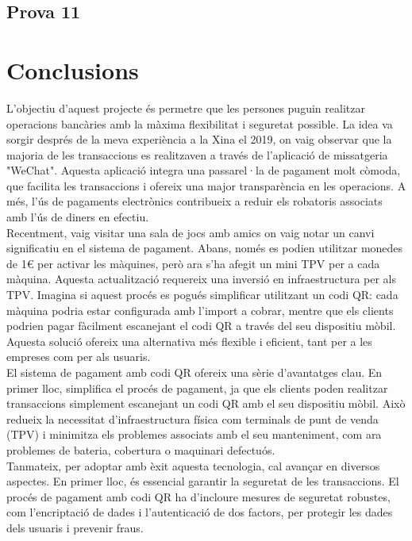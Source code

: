 \documentclass[a4paper,12pt,twoside]{ThesisStyle}
\begin{document}
\section{Prova 11}





\chapter{Conclusions}
\label{chp:conclusions}


L'objectiu d'aquest projecte és permetre que les persones puguin realitzar operacions bancàries amb la màxima flexibilitat i seguretat possible. La idea va sorgir després de la meva experiència a la Xina el 2019, on vaig observar que la majoria de les transaccions es realitzaven a través de l'aplicació de missatgeria "WeChat". Aquesta aplicació integra una passarel·la de pagament molt còmoda, que facilita les transaccions i ofereix una major transparència en les operacions. A més, l'ús de pagaments electrònics contribueix a reduir els robatoris associats amb l'ús de diners en efectiu.\\

Recentment, vaig visitar una sala de jocs amb amics on vaig notar un canvi significatiu en el sistema de pagament. Abans, només es podien utilitzar monedes de 1€ per activar les màquines, però ara s'ha afegit un mini TPV per a cada màquina. Aquesta actualització requereix una inversió en infraestructura per als TPV. Imagina si aquest procés es pogués simplificar utilitzant un codi QR: cada màquina podria estar configurada amb l'import a cobrar, mentre que els clients podrien pagar fàcilment escanejant el codi QR a través del seu dispositiu mòbil. Aquesta solució ofereix una alternativa més flexible i eficient, tant per a les empreses com per als usuaris.\\


El sistema de pagament amb codi QR ofereix una sèrie d'avantatges clau. En primer lloc, simplifica el procés de pagament, ja que els clients poden realitzar transaccions simplement escanejant un codi QR amb el seu dispositiu mòbil. Això redueix la necessitat d'infraestructura física com terminals de punt de venda (TPV) i minimitza els problemes associats amb el seu manteniment, com ara problemes de bateria, cobertura o maquinari defectuós.\\

Tanmateix, per adoptar amb èxit aquesta tecnologia, cal avançar en diversos aspectes. En primer lloc, és essencial garantir la seguretat de les transaccions. El procés de pagament amb codi QR ha d'incloure mesures de seguretat robustes, com l'encriptació de dades i l'autenticació de dos factors, per protegir les dades dels usuaris i prevenir fraus.\\
\end{document}
